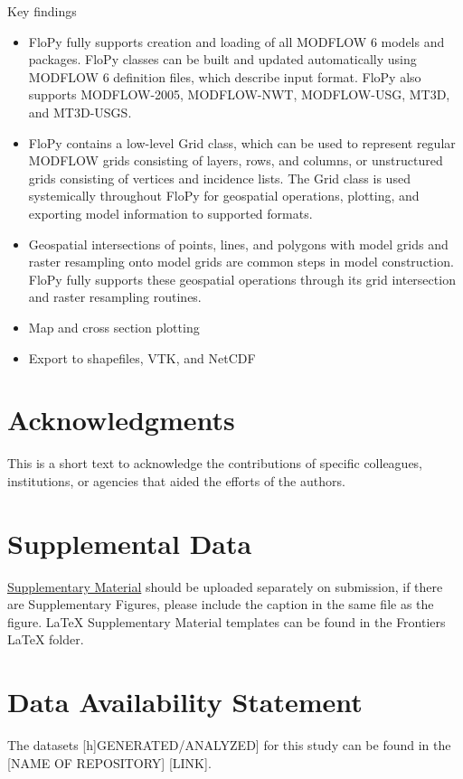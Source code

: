 \documentclass[11pt, oneside]{article}   	%
\begin{document}
Key findings

\begin{itemize}
\item FloPy fully supports creation and loading of all MODFLOW 6 models and packages.  FloPy classes can be built and updated automatically using MODFLOW 6 definition files, which describe input format.  FloPy also supports MODFLOW-2005, MODFLOW-NWT, MODFLOW-USG, MT3D, and MT3D-USGS.
\item FloPy contains a low-level Grid class, which can be used to represent regular MODFLOW grids consisting of layers, rows, and columns, or unstructured grids consisting of vertices and incidence lists.  The Grid class is used systemically throughout FloPy for geospatial operations, plotting, and exporting model information to supported formats.
\item Geospatial intersections of points, lines, and polygons with model grids and raster resampling onto model grids are common steps in model construction.  FloPy fully supports these geospatial operations through its grid intersection and raster resampling routines.  
\item Map and cross section plotting
\item Export to shapefiles, VTK, and NetCDF
\end{itemize}


\section*{Acknowledgments}
This is a short text to acknowledge the contributions of specific colleagues, institutions, or agencies that aided the efforts of the authors.

\section*{Supplemental Data}
 \href{http://home.frontiersin.org/about/author-guidelines#SupplementaryMaterial}{Supplementary Material} should be uploaded separately on submission, if there are Supplementary Figures, please include the caption in the same file as the figure. LaTeX Supplementary Material templates can be found in the Frontiers LaTeX folder.

\section*{Data Availability Statement}
The datasets [h]GENERATED/ANALYZED] for this study can be found in the [NAME OF REPOSITORY] [LINK].



\end{document}
